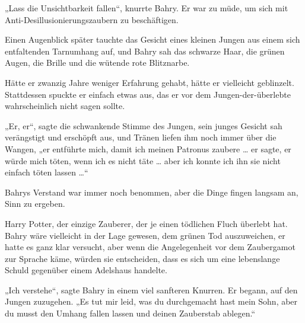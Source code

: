 „Lass die Unsichtbarkeit fallen“, knurrte Bahry. Er war zu müde, um sich mit Anti-Desillusionierungszaubern zu beschäftigen.

Einen Augenblick später tauchte das Gesicht eines kleinen Jungen aus einem sich entfaltenden Tarnumhang auf, und Bahry sah das schwarze Haar, die grünen Augen, die Brille und die wütende rote Blitznarbe.

Hätte er zwanzig Jahre weniger Erfahrung gehabt, hätte er vielleicht geblinzelt. Stattdessen spuckte er einfach etwas aus, das er vor dem Jungen-der-überlebte wahrscheinlich nicht sagen sollte.

„Er, er“, sagte die schwankende Stimme des Jungen, sein junges Gesicht sah verängstigt und erschöpft aus, und Tränen liefen ihm noch immer über die Wangen, „er entführte mich, damit ich meinen Patronus zaubere … er sagte, er würde mich töten, wenn ich es nicht täte … aber ich konnte ich ihn sie nicht einfach töten lassen …“

Bahrys Verstand war immer noch benommen, aber die Dinge fingen langsam an, Sinn zu ergeben.

Harry Potter, der einzige Zauberer, der je einen tödlichen Fluch überlebt hat. Bahry wäre vielleicht in der Lage gewesen, dem grünen Tod auszuweichen, er hatte es ganz klar versucht, aber wenn die Angelegenheit vor dem Zaubergamot zur Sprache käme, würden sie entscheiden, dass es sich um eine lebenslange Schuld gegenüber einem Adelshaus handelte.

„Ich verstehe“, sagte Bahry in einem viel sanfteren Knurren. Er begann, auf den Jungen zuzugehen.
„Es tut mir leid, was du durchgemacht hast mein Sohn, aber du musst den Umhang fallen lassen und deinen Zauberstab ablegen.“

